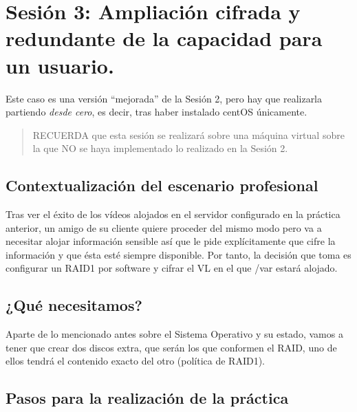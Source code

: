 \documentclass[
]{book}
\begin{document}
\hypertarget{sesiuxf3n-3-ampliaciuxf3n-cifrada-y-redundante-de-la-capacidad-para-un-usuario.}{%
\section{Sesión 3: Ampliación cifrada y redundante de la capacidad para un usuario.}\label{sesiuxf3n-3-ampliaciuxf3n-cifrada-y-redundante-de-la-capacidad-para-un-usuario.}}

Este caso es una versión ``mejorada'' de la Sesión 2, pero hay que realizarla partiendo \emph{desde cero}, es decir, tras haber instalado centOS únicamente.

\begin{quote}
RECUERDA que esta sesión se realizará sobre una máquina virtual sobre la que NO se haya implementado lo realizado en la Sesión 2.
\end{quote}

\hypertarget{contextualizaciuxf3n-del-escenario-profesional-1}{%
\subsection{Contextualización del escenario profesional}\label{contextualizaciuxf3n-del-escenario-profesional-1}}

Tras ver el éxito de los vídeos alojados en el servidor configurado en la práctica anterior, un amigo de su cliente quiere proceder del mismo modo pero va a necesitar alojar información sensible así que le pide explícitamente que cifre la información y que ésta esté siempre disponible. Por tanto, la decisión que toma es configurar un RAID1 por software y cifrar el VL en el que /var estará alojado.

\hypertarget{quuxe9-necesitamos}{%
\subsection{¿Qué necesitamos?}\label{quuxe9-necesitamos}}

Aparte de lo mencionado antes sobre el Sistema Operativo y su estado, vamos a tener que crear dos discos extra, que serán los que conformen el RAID, uno de ellos tendrá el contenido exacto del otro (política de RAID1).

\hypertarget{pasos-para-la-realizaciuxf3n-de-la-pruxe1ctica}{%
\subsection{Pasos para la realización de la práctica}\label{pasos-para-la-realizaciuxf3n-de-la-pruxe1ctica}}
\end{document}
